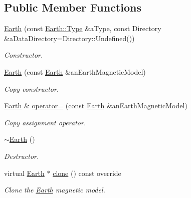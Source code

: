 \subsection*{Public Member Functions}
\begin{DoxyCompactItemize}
\item 
\hyperlink{classlibrary_1_1physics_1_1environment_1_1magnetic_1_1_earth_a540d3bfdc34d984bb7a68a9416266139}{Earth} (const \hyperlink{classlibrary_1_1physics_1_1environment_1_1magnetic_1_1_earth_ab9d257d23aa5899a3ef36c7dec62ef72}{Earth\+::\+Type} \&a\+Type, const Directory \&a\+Data\+Directory=Directory\+::\+Undefined())
\begin{DoxyCompactList}\small\item\em Constructor. \end{DoxyCompactList}\item 
\hyperlink{classlibrary_1_1physics_1_1environment_1_1magnetic_1_1_earth_ac4072cc6bcc24f78234fbbce50feee54}{Earth} (const \hyperlink{classlibrary_1_1physics_1_1environment_1_1magnetic_1_1_earth}{Earth} \&an\+Earth\+Magnetic\+Model)
\begin{DoxyCompactList}\small\item\em Copy constructor. \end{DoxyCompactList}\item 
\hyperlink{classlibrary_1_1physics_1_1environment_1_1magnetic_1_1_earth}{Earth} \& \hyperlink{classlibrary_1_1physics_1_1environment_1_1magnetic_1_1_earth_a8db1f77519e511e1e92022c09c6eb052}{operator=} (const \hyperlink{classlibrary_1_1physics_1_1environment_1_1magnetic_1_1_earth}{Earth} \&an\+Earth\+Magnetic\+Model)
\begin{DoxyCompactList}\small\item\em Copy assignment operator. \end{DoxyCompactList}\item 
\hyperlink{classlibrary_1_1physics_1_1environment_1_1magnetic_1_1_earth_a7290a8f1b5c7049d02f9f761b1697662}{$\sim$\+Earth} ()
\begin{DoxyCompactList}\small\item\em Destructor. \end{DoxyCompactList}\item 
virtual \hyperlink{classlibrary_1_1physics_1_1environment_1_1magnetic_1_1_earth}{Earth} $\ast$ \hyperlink{classlibrary_1_1physics_1_1environment_1_1magnetic_1_1_earth_a106e6aa296e0f746815e3c0c655bcace}{clone} () const override
\begin{DoxyCompactList}\small\item\em Clone the \hyperlink{classlibrary_1_1physics_1_1environment_1_1magnetic_1_1_earth}{Earth} magnetic model. \end{DoxyCompactList}\item 

\end{DoxyCompactItemize}
